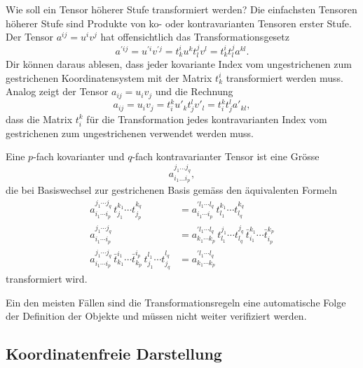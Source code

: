 Wie soll ein Tensor höherer Stufe transformiert werden?
Die einfachsten Tensoren höherer Stufe sind Produkte von
ko- oder kontravarianten Tensoren erster Stufe.
Der Tensor $a^{ij}=u^iv^j$ hat offensichtlich das Transformationsgesetz
\[
a^{\prime ij}
=
u^{\prime i}v^{\prime j}
=
t^i_k u^k
t^j_l v^l
=
t^i_k
t^j_l
a^{kl}.
\]
Dir können daraus ablesen, dass jeder kovariante Index
vom ungestrichenen zum gestrichenen Koordinatensystem mit der Matrix
$t^i_k$ transformiert werden muss.
Analog zeigt der Tensor $a_{ij}=u_iv_j$ und die Rechnung
\[
a_{ij}
=
u_iv_j
=
t_i^k u'_k
t_j^l v'_l
=
t_i^k
t_j^l a'_{kl},
\]
dass die Matrix $t_i^k$ für die Transformation jedes kontravarianten 
Index vom gestrichenen zum ungestrichenen verwendet werden muss.

\begin{definition}
Eine $p$-fach kovarianter und $q$-fach kontravarianter Tensor ist
eine Grösse
\[
a_{i_1\dots i_p}^{j_1\dots j_q},
\]
die bei Basiswechsel zur gestrichenen Basis gemäss den äquivalenten Formeln
\begin{align*}
a_{i_1\cdots i_p}^{j_1\cdots j_q}
\,
t_{j_1}^{k_1}
\cdots
t_{j_p}^{k_q}
&=
a_{i_1\cdots i_p}^{\prime l_1\cdots l_q}
\,
t_{l_1}^{k_1}
\cdots
t_{l_q}^{k_q}
\\
a_{i_1\cdots i_p}^{j_1\cdots j_q}
&=
a_{k_1\cdots k_p}^{\prime l_1\cdots l_q}
\,
t_{l_1}^{j_1}\cdots t_{l_q}^{j_q}
\,
\bar t_{i_1}^{k_1}\cdots \bar t_{i_p}^{k_p}
\\
a_{i_1\cdots i_p}^{j_1\cdots j_q}
\,
\bar t_{k_1}^{i_1}\cdots \bar t_{k_p}^{i_p}
\,
t_{j_1}^{l_1}\cdots t_{j_q}^{l_q}
&=
a_{k_1\cdots k_p}^{\prime l_1\cdots l_q}
\end{align*}
transformiert wird.
\end{definition}

Ein den meisten Fällen sind die Transformationsregeln eine automatische
Folge der Definition der Objekte und müssen nicht weiter verifiziert werden.

\subsection{Koordinatenfreie Darstellung}

